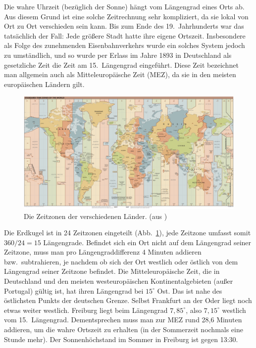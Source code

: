 Die wahre Uhrzeit (bez\"uglich der Sonne) h\"angt vom L\"angengrad eines Orts ab.
Aus diesem Grund ist eine solche Zeitrechnung sehr kompliziert, da sie lokal von Ort zu Ort
verschieden sein kann. Bis zum Ende des 19.\ Jahrhunderts war das tats\"achlich der Fall:
Jede gr\"o\ss ere Stadt hatte ihre eigene Ortszeit. Insbesondere als Folge des
zunehmenden Eisenbahnverkehrs wurde ein solches System jedoch zu
umst\"andlich, und so wurde per Erlass im Jahre 1893 in Deutschland als gesetzliche
Zeit die Zeit am 15.\ L\"angengrad eingef\"uhrt. Diese Zeit bezeichnet man allgemein
auch als \glqq Mitteleurop\"aische Zeit (MEZ)\grqq, da 
sie in den meisten europ\"aischen L\"andern gilt. 

\begin{figure}[htb]
\includegraphics[width=\textwidth]{./Bilder/World_Time_Zones_Map.png}
\caption{\label{fig_Zeitzonen}%
Die Zeitzonen der verschiedenen L\"ander. (aus \cite{Wikipedia_Zeitzone})}
\end{figure}

Die Erdkugel ist in 24 Zeitzonen eingeteilt (Abb.\ \ref{fig_Zeitzonen}), jede Zeitzone umfasst 
somit $360/24=15$ L\"angengrade. Befindet sich ein Ort nicht auf dem L\"angengrad seiner Zeitzone, muss 
man pro L\"angengraddifferenz 4 Minuten addieren bzw.\ subtrahieren, je nachdem ob sich der
Ort westlich oder \"ostlich von dem L\"angengrad seiner Zeitzone befindet. Die Mitteleurop\"aische
Zeit, die in Deutschland und den meisten westeurop\"aischen Kontinentalgebieten (au\ss er Portugal)
g\"ultig ist, hat ihren L\"angengrad bei $15^\circ$ Ost. Das ist nahe des
\"ostlichsten Punkts der deutschen Grenze. Selbst Frankfurt an der Oder liegt noch etwas weiter
westlich. Freiburg 
liegt beim L\"angengrad $7,85^\circ$, also $7,15^\circ$ westlich vom 15.\
L\"angengrad. Dementsprechen muss man zur MEZ rund 28,6 Minuten addieren, um die
wahre Ortszeit zu erhalten (in der Sommerzeit nochmals eine Stunde mehr). Der Sonnenh\"ochstand
im Sommer in Freiburg ist gegen 13:30.   


